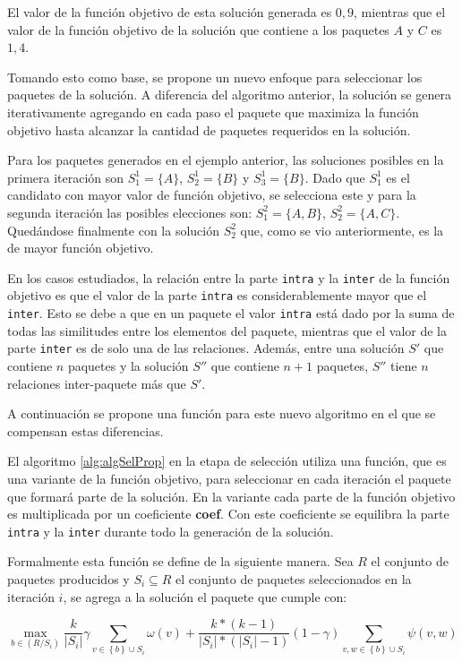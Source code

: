 El valor de la función objetivo de esta solución generada es $0,9$, mientras que el valor de la función objetivo de la solución que contiene a los paquetes $A$ y $C$ es $1,4$.

Tomando esto como base, se propone un nuevo enfoque para seleccionar los paquetes de la solución. A diferencia del algoritmo anterior, la solución se genera iterativamente agregando en cada paso el paquete que maximiza la función objetivo hasta alcanzar la cantidad de paquetes requeridos en la solución.

Para los paquetes generados en el ejemplo anterior, las soluciones posibles en la primera iteración son $S^{1}_{1}=\{A\}$, $S^{1}_{2}=\{B\}$ y $S^{1}_{3}=\{B\}$. Dado que $S^{1}_{1}$ es el candidato con mayor valor de función objetivo, se selecciona este y para la segunda iteración las posibles elecciones son:  $S^{2}_{1}=\{A,B\}$, $S^{2}_{2}=\{A,C\}$. Quedándose finalmente con la solución $S^{2}_{2}$ que, como se vio anteriormente, es la de mayor función objetivo.

En los casos estudiados, la relación entre la parte \texttt{intra} y la \texttt{inter} de la función objetivo es que el valor de la parte \texttt{intra} es considerablemente mayor que el \texttt{inter}. Esto se debe a que en un paquete el valor \texttt{intra} está dado por la suma de todas las similitudes entre los elementos del paquete, mientras que el valor de la parte \texttt{inter} es de solo una de las relaciones. Además, entre una solución $S'$ que contiene $n$ paquetes y la solución $S''$ que contiene $n+1$ paquetes, $S''$ tiene $n$ relaciones inter-paquete más que $S'$. 

A continuación se propone una función para este nuevo algoritmo en el que se compensan estas diferencias.

El algoritmo \ref{alg:algSelProp} en la etapa de selección utiliza una función, que es una variante de la función objetivo, para seleccionar en cada iteración el paquete que formará parte de la solución. En la variante cada parte de la función objetivo es multiplicada por un coeficiente \textbf{coef}. Con este coeficiente se equilibra la parte \texttt{intra} y la \texttt{inter} durante todo la generación de la solución.   

Formalmente esta función se define de la siguiente manera. Sea $R$ el conjunto de paquetes producidos y $S_i \subseteq R$ el conjunto de paquetes seleccionados en la iteración $i$, se agrega a la solución el paquete que cumple con:

\begin{equation}
\max_{b \in (R/S_i)}{\dfrac{k}{|S_i|}} \gamma \sum_{v \in \left\{b\right\} \cup S_i}{\omega(v)} + \dfrac{k * (k-1)}{|S_i| * (|S_i|-1)} (1-\gamma) \sum_{v,w \in \left\{b\right\} \cup S_i}{\psi(v,w)}
\end{equation}

